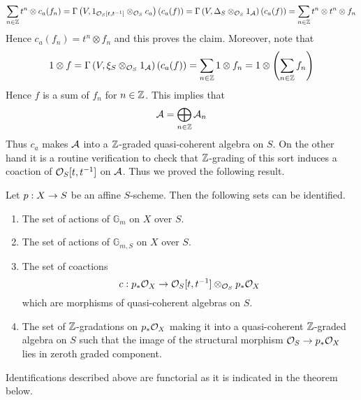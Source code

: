 $$\sum_{n\in {\mathbb Z}}t^n\otimes c_a(f_n) = \Gamma\left(V,1_{{\mathcal O}_S[t,t^{-1}]}\otimes_{{\mathcal O}_S}c_a\right)(c_a(f)) = \Gamma\left(V,\Delta_S\otimes_{{\mathcal O}_S}1_{{\mathcal A}}\right)(c_a(f)) = \sum_{n\in {\mathbb Z}}t^n\otimes t^n\otimes f_n$$
Hence $c_a(f_n) = t^n\otimes f_n$ and this proves the claim. Moreover, note that
$$1\otimes f = \Gamma\left(V,\xi_S\otimes_{{\mathcal O}_S}1_{{\mathcal A}}\right)(c_a(f)) = \sum_{n\in {\mathbb Z}}1\otimes f_n = 1\otimes \left(\sum_{n\in {\mathbb Z}}f_n\right)$$
Hence $f$ is a sum of $f_n$ for $n\in {\mathbb Z}$. This implies that
$${\mathcal A} = \bigoplus_{n\in {\mathbb Z}}{\mathcal A}_n$$
Thus $c_a$ makes ${\mathcal A}$ into a ${\mathbb Z}$-graded quasi-coherent algebra on $S$. On the other hand it is a routine verification to check that ${\mathbb Z}$-grading of this sort induces a coaction of ${\mathcal O}_S[t,t^{-1}]$ on ${\mathcal A}$. Thus we proved the following result.

\begin{theorem}\label{theorem:description_of_multiplicative_group_actions}
Let $p:X\rightarrow S$ be an affine $S$-scheme. Then the following sets can be identified.
\begin{enumerate}[label=\emph{\textbf{(\arabic*)}}, leftmargin=3.0em]
\item The set of actions of $\mathbb{G}_m$ on $X$ over $S$.
\item The set of actions of $\mathbb{G}_{m,S}$ on $X$ over $S$.
\item The set of coactions 
$$c:p_*{\mathcal O}_X\rightarrow {\mathcal O}_{S}[t,t^{-1}]\otimes_{{\mathcal O}_S}p_*{\mathcal O}_X$$
which are morphisms of quasi-coherent algebras on $S$.
\item The set of ${\mathbb Z}$-gradations on $p_*{\mathcal O}_X$ making it into a quasi-coherent ${\mathbb Z}$-graded algebra on $S$ such that the image of the structural morphism ${\mathcal O}_S\rightarrow p_*{\mathcal O}_X$ lies in zeroth graded component.
\end{enumerate}
\end{theorem}
\noindent
Identifications described above are functorial as it is indicated in the theorem below.

